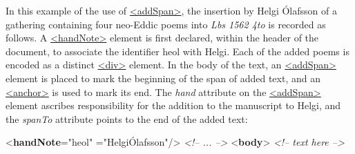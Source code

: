 In this example of the use of \hyperref[TEI.addSpan]{<addSpan>}, the insertion by Helgi Ólafsson of a gathering containing four neo-Eddic poems into \textit{Lbs 1562 4to} is recorded as follows.  A \hyperref[TEI.handNote]{<handNote>} element is first declared, within the header of the document, to associate the identifier heol with Helgi. Each of the added poems is encoded as a distinct \hyperref[TEI.div]{<div>} element. In the body of the text, an \hyperref[TEI.addSpan]{<addSpan>} element is placed to mark the beginning of the span of added text, and an \hyperref[TEI.anchor]{<anchor>} is used to mark its end. The {\itshape hand} attribute on the \hyperref[TEI.addSpan]{<addSpan>} element ascribes responsibility for the addition to the manuscript to Helgi, and the {\itshape spanTo} attribute points to the end of the added text: \par\bgroup{}\exampleFont \begin{shaded}\noindent\mbox{}{<\textbf{handNote}\hspace*{1em}{xml:id}="{heol}"\mbox{}\newline 
\hspace*{1em}{scribe}="{HelgiÓlafsson}"/>}\mbox{}\newline 
\textit{<!-- ... -->}\mbox{}\newline 
{<\textbf{body}>}\mbox{}\newline 
{}\mbox{}\newline 
\textit{<!-- text here -->}\mbox{}\newline 
{}\mbox{}\newline 
{}\mbox{}\newline 

\end{shaded}
